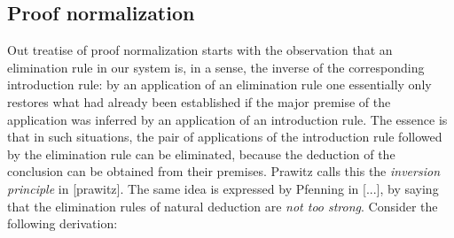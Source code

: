 
\subsection{Proof normalization}


Out treatise of proof normalization starts with the observation that an
elimination rule in our system is, in a sense, the inverse of the corresponding
introduction rule: by an application of an elimination rule one essentially only
restores what had already been established if the major premise of the
application was inferred by an application of an introduction rule. The essence
is that in such situations, the pair of applications of the introduction rule
followed by the elimination rule can be eliminated, because the deduction of the
conclusion can be obtained from their premises. Prawitz calls this the
\emph{inversion principle} in [prawitz]. The same idea is expressed by Pfenning
in [...], by saying that the elimination rules of natural deduction are
\emph{not too strong}. Consider the following derivation:

